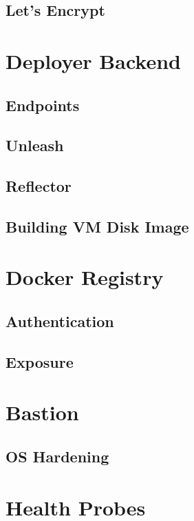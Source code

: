 \subsection{Let's Encrypt}

\section{Deployer Backend}

\subsection{Endpoints}

\subsection{Unleash}

\subsection{Reflector}

\subsection{Building VM Disk Image}

\section{Docker Registry}

\subsection{Authentication}
\subsection{Exposure}

\section{Bastion}
\subsection{OS Hardening}

\section{Health Probes}

